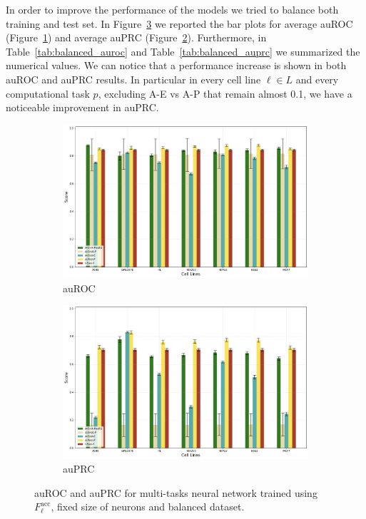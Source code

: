 In order to improve the performance of the models we tried to balance both training and test set. In Figure~\ref{fig:balanced_results} we reported the bar plots for average auROC (Figure~\ref{fig:auroc_balanced}) and average auPRC (Figure~\ref{fig:auprc_balanced}). Furthermore, in Table~\ref{tab:balanced_auroc} and Table~\ref{tab:balanced_auprc} we summarized the numerical values. We can notice that a performance increase is shown in both auROC and auPRC results. In particular in every cell line $\ell \in L$ and every computational task $p$, excluding A-E vs A-P that remain almost 0.1, we have a noticeable improvement in auPRC.  
%
\begin{figure}[!htbp]
    \centering
    \begin{subfigure}[b]{\textwidth}
        \includegraphics[width=\textwidth]{images/results_plots/balanced_dataset_auroc.png}
        \caption{auROC}
        \label{fig:auroc_balanced}
    \end{subfigure}
    \begin{subfigure}[b]{\textwidth}
        \includegraphics[width=\textwidth]{images/results_plots/balanced_dataset_auprc.png}
        \caption{auPRC}
        \label{fig:auprc_balanced}
    \end{subfigure}
    \caption{auROC and auPRC for multi-tasks neural network trained using $F_\ell^{\textrm{acc}}$, fixed size of neurons and balanced dataset.}
    \label{fig:balanced_results}
\end{figure}

